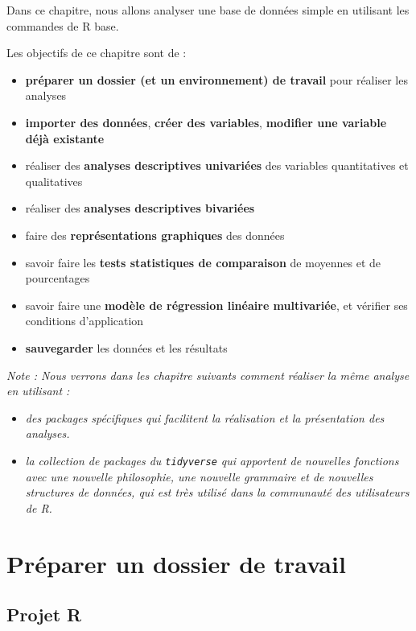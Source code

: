 \documentclass[
]{book}
\providecommand{\tightlist}{%
  \setlength{\itemsep}{0pt}\setlength{\parskip}{0pt}}
\begin{document}
Dans ce chapitre, nous allons analyser une base de données simple en utilisant les commandes de R base.

Les objectifs de ce chapitre sont de :

\begin{itemize}
\tightlist
\item
  \textbf{préparer un dossier (et un environnement) de travail} pour réaliser les analyses
\item
  \textbf{importer des données}, \textbf{créer des variables}, \textbf{modifier une variable déjà existante}
\item
  réaliser des \textbf{analyses descriptives univariées} des variables quantitatives et qualitatives
\item
  réaliser des \textbf{analyses descriptives bivariées}
\item
  faire des \textbf{représentations graphiques} des données
\item
  savoir faire les \textbf{tests statistiques de comparaison} de moyennes et de pourcentages
\item
  savoir faire une \textbf{modèle de régression linéaire multivariée}, et vérifier ses conditions d'application
\item
  \textbf{sauvegarder} les données et les résultats
\end{itemize}

\emph{Note : Nous verrons dans les chapitre suivants comment réaliser la même analyse en utilisant : }

\begin{itemize}
\tightlist
\item
  \emph{des packages spécifiques qui facilitent la réalisation et la présentation des analyses.}
\item
  \emph{la collection de packages du \texttt{tidyverse} qui apportent de nouvelles fonctions avec une nouvelle philosophie, une nouvelle grammaire et de nouvelles structures de données, qui est très utilisé dans la communauté des utilisateurs de R.}
\end{itemize}

\section{Préparer un dossier de travail}\label{pruxe9parer-un-dossier-de-travail}

\subsection{Projet R}\label{projet-r}
\end{document}
